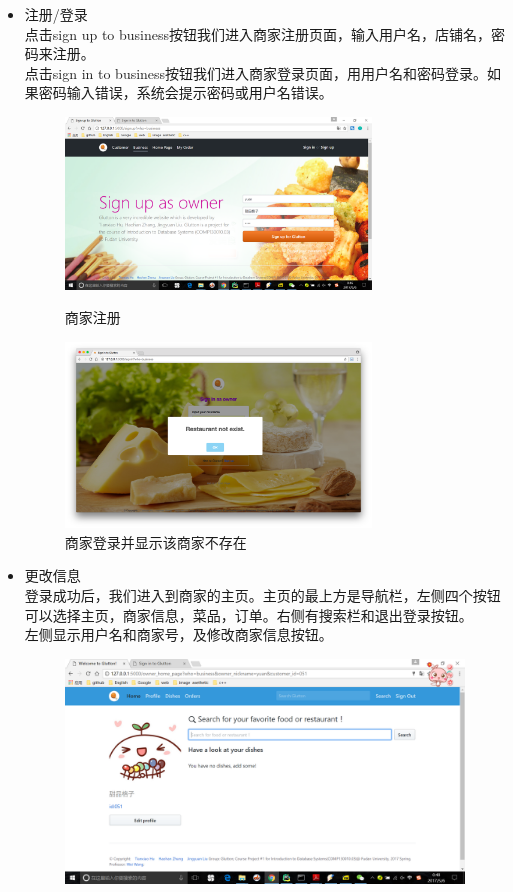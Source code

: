 \documentclass[12pt, oneside,a4paper]{article}
\begin{document}
  \begin{itemize}
  \item 注册/登录\\
  点击sign up to business按钮我们进入商家注册页面，输入用户名，店铺名，密码来注册。\\
  点击sign in to business按钮我们进入商家登录页面，用用户名和密码登录。如果密码输入错误，系统会提示密码或用户名错误。
  \begin{figure}[H]
   \begin{minipage}[t]{0.5\linewidth}
    \centering
     \includegraphics[width=3.2in]{re-signup.jpg}
     \caption{\small{商家注册}}
   \end{minipage}
   \begin{minipage}[t]{0.5\linewidth}
    \centering
     \includegraphics[width=3.2in]{re-signin.jpg}
      \caption{\small{商家登录并显示该商家不存在}}
   \end{minipage}
   \end{figure}
  \item 更改信息\\
  登录成功后，我们进入到商家的主页。主页的最上方是导航栏，左侧四个按钮可以选择主页，商家信息，菜品，订单。右侧有搜索栏和退出登录按钮。\\
  左侧显示用户名和商家号，及修改商家信息按钮。
  \begin{figure}[H]
   \centering
     \includegraphics[width=6.00in]{re-home.jpg}

\end{figure}
\end{itemize}
\end{document}
